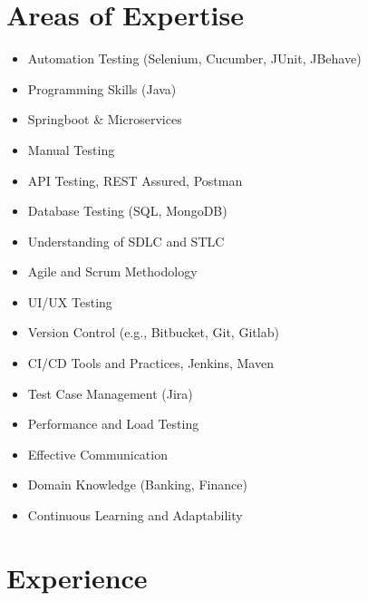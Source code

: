 \documentclass[11pt,a4paper]{article}
\begin{document}
    \section*{Areas of Expertise}
        \begin{minipage}{0.5\linewidth}
        \begin{itemize}
            \item Automation Testing (Selenium, Cucumber, JUnit, JBehave)
            \item Programming Skills (Java)
            \item Springboot & Microservices
            \item Manual Testing
            \item API Testing, REST Assured, Postman
            \item Database Testing (SQL, MongoDB)
            \item Understanding of SDLC and STLC
            \item Agile and Scrum Methodology
            \item UI/UX Testing
        \end{itemize}
    \end{minipage}
    \begin{minipage}{0.5\linewidth}
        \begin{itemize}
            \item Version Control (e.g., Bitbucket, Git, Gitlab)
            \item CI/CD Tools and Practices, Jenkins, Maven
            \item Test Case Management (Jira)
            \item Performance and Load Testing
            \item Effective Communication
            \item Domain Knowledge (Banking, Finance)
            \item Continuous Learning and Adaptability
        \end{itemize}
    \end{minipage}


    \section*{Experience}
\end{document}
